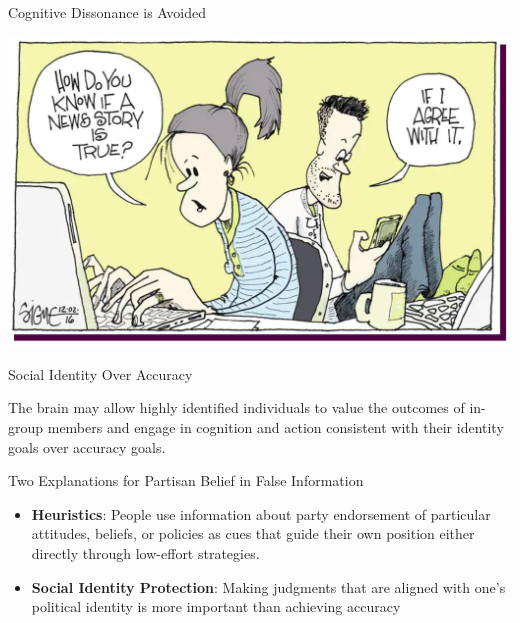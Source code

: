 \documentclass[nobackground,dvipsnames,table]{beamer}
\begin{document}
\begin{frame}{Cognitive Dissonance is Avoided}

\includegraphics[width=\textwidth]{img/fig6.jpg}

\end{frame}


\begin{frame}{Social Identity Over Accuracy}

The brain may allow highly identified individuals to value the outcomes of in-group members and engage in cognition and action consistent with their identity goals over accuracy goals. 

\end{frame}


\begin{frame}{Two Explanations for Partisan Belief in False Information}

\begin{itemize}
    \item \textbf{Heuristics}: People use information about party endorsement of particular attitudes, beliefs, or policies as cues that guide their own position either directly through low-effort strategies.
    \item \textbf{Social Identity Protection}: Making judgments that are aligned with one’s political identity is more important than achieving accuracy
\end{itemize}
    
\end{frame}
\end{document}
